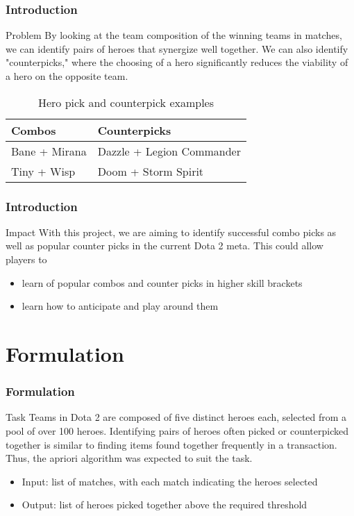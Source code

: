\documentclass{beamer}
\begin{document}
\begin{frame}
\frametitle{Introduction}
\begin{block}{Problem}
By looking at the team composition of the winning teams in matches, we can identify pairs of heroes that synergize well together. We can also identify "counterpicks," where the choosing of a hero significantly reduces the viability of a hero on the opposite team. 
\end{block}

\begin{table}
\begin{tabular}{l l}
\toprule
\textbf{Combos} & \textbf{Counterpicks}\\
\midrule
Bane + Mirana & Dazzle + Legion Commander\\
Tiny + Wisp & Doom + Storm Spirit\\
\bottomrule
\end{tabular}
\caption{Hero pick and counterpick examples}
\end{table}
\end{frame}


\begin{frame}
\frametitle{Introduction}
\begin{block}{Impact}
With this project, we are aiming to identify successful combo picks as well as popular counter picks in the current Dota 2 meta. This could allow players to 
\begin{itemize}
\item learn of popular combos and counter picks in higher skill brackets
\item learn how to anticipate and play around them
\end{itemize}
\end{block}
\end{frame}

\section{Formulation}
\begin{frame}
\frametitle{Formulation}
\begin{block}{Task}
Teams in Dota 2 are composed of five distinct heroes each, selected from a pool of over 100 heroes. Identifying pairs of heroes often picked or counterpicked together is similar to finding items found together frequently in a transaction. Thus, the apriori algorithm was expected to suit the task.\\
\begin{itemize}
\item Input: list of matches, with each match indicating the heroes selected
\item Output: list of heroes picked together above the required threshold
\end{itemize}
\end{block}
\end{frame}
\end{document}
